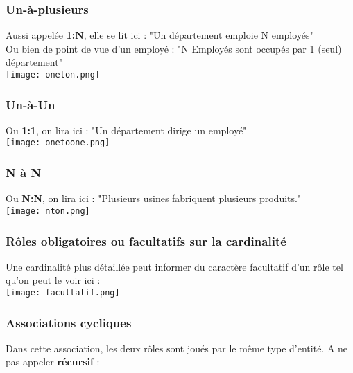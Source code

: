 \documentclass{report}
\begin{document}
			\subsubsection{Un-à-plusieurs}

				Aussi appelée \textbf{1:N}, elle se lit ici : "Un département emploie N employés"\\
				Ou bien de point de vue d'un employé : "N Employés sont occupés par 1 (seul) département"\\

				\texttt{[image: oneton.png]}\\

			\subsubsection{Un-à-Un}

				Ou \textbf{1:1}, on lira ici : "Un département dirige un employé"\\

				\texttt{[image: onetoone.png]}\\


			\subsubsection{N à N}

				Ou \textbf{N:N}, on lira ici : "Plusieurs usines fabriquent plusieurs produits."\\

				\texttt{[image: nton.png]}\\

			\subsubsection{Rôles obligatoires ou facultatifs sur la cardinalité}

				Une cardinalité plus détaillée peut informer du caractère facultatif d'un rôle tel qu'on peut le voir ici : \\

				\texttt{[image: facultatif.png]}\\

			\subsubsection{Associations cycliques}

				Dans cette association, les deux rôles sont joués par le même type d'entité. A ne pas appeler \textbf{récursif} : \\
\end{document}

